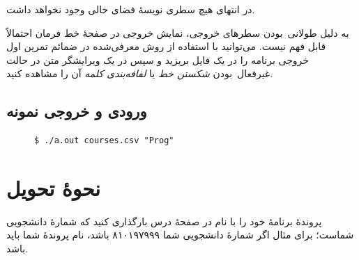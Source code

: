 \documentclass{utap}
\begin{document}
    در انتهای هیچ سطری نویسهٔ فضای خالی وجود نخواهد داشت.

    به دلیل طولانی~بودن سطرهای خروجی، نمایش خروجی در صفحهٔ خط فرمان احتمالاً قابل فهم نیست. می‌توانید با استفاده از روش معرفی‌شده در ضمائم تمرین اول خروجی برنامه را در یک فایل بریزید و سپس در یک ویرایشگر متن در حالت غیرفعال~بودن \textit{شکستن خط} یا \textit{لفافه‌بندی کلمه} آن را مشاهده کنید.

    \clearpage

    \subsection{ورودی و خروجی نمونه\label{sec:sample}}

    \begin{latin}
    \begin{figure}[H]
    \centering
    \begin{Verbatim}[frame=topline,label={\rl{ورودی}}]
$ ./a.out courses.csv "Prog"
    \end{Verbatim}
    \end{figure}
    \end{latin}

    \begin{latin}
    \begin{figure}[H]
    \centering
    \end{figure}
    \end{latin}


    \begin{latin}
    \begin{figure}
    \centering
    {\fontsize{4.4}{4.4} \selectfont
    }
    \end{figure}
    \end{latin}

    \clearpage
    
    \section{نحوهٔ تحویل}

    پروندهٔ برنامهٔ خود را با نام  در صفحهٔ  درس بارگذاری کنید که  شمارهٔ دانشجویی شماست؛ برای مثال اگر شمارهٔ دانشجویی شما ۸۱۰۱۹۷۹۹۹ باشد، نام پروندهٔ شما باید  باشد.
\end{document}
